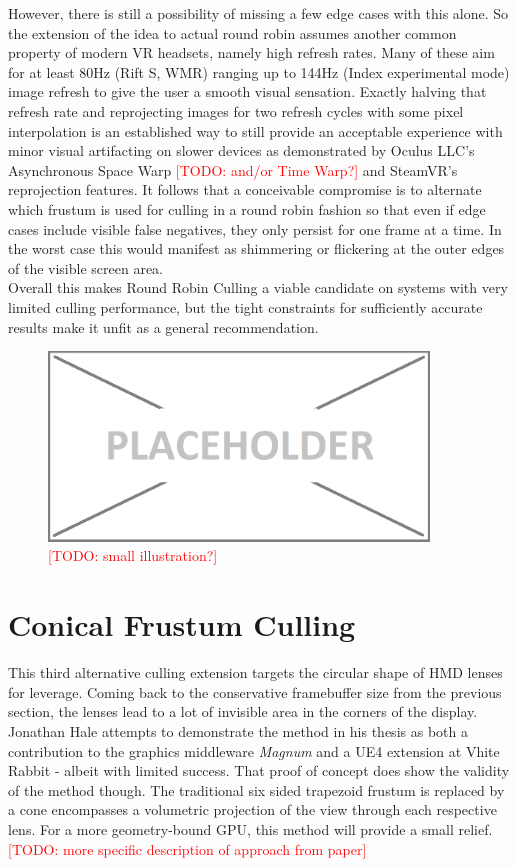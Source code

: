 However, there is still a possibility of missing a few edge cases with this alone. So the extension of the idea to actual round robin assumes another common property of modern VR headsets, namely high refresh rates. Many of these aim for at least 80Hz (Rift S, WMR) ranging up to 144Hz (Index experimental mode) image refresh to give the user a smooth visual sensation.
Exactly halving that refresh rate and reprojecting images for two refresh cycles with some pixel interpolation is an established way to still provide an acceptable experience with minor visual artifacting on slower devices as demonstrated by Oculus LLC's Asynchronous Space Warp \textcolor{red}{[TODO: and/or Time Warp?]} and SteamVR's reprojection features. It follows that a conceivable compromise is to alternate which frustum is used for culling in a round robin fashion so that even if edge cases include visible false negatives, they only persist for one frame at a time. In the worst case this would manifest as shimmering or flickering at the outer edges of the visible screen area. \\
Overall this makes Round Robin Culling a viable candidate on systems with very limited culling performance, but the tight constraints for sufficiently accurate results make it unfit as a general recommendation. 

\begin{figure}[htb]
  \centering
  \includegraphics[width=0.9\textwidth]{pictures/placeholder}
  \caption{\textcolor{red}{[TODO: small illustration?]}} \label{fig:blob}
\end{figure}

\section{Conical Frustum Culling}
This third alternative culling extension targets the circular shape of HMD lenses for leverage. Coming back to the conservative framebuffer size from the previous section, the lenses lead to a lot of invisible area in the corners of the display. Jonathan Hale attempts to demonstrate the method in his thesis \cite{Hale.2018} as both a contribution to the graphics middleware \textit{Magnum}\cite{Vondrus.30.10.2019} and a UE4 extension at Vhite Rabbit\cite{VhiteRabbit.08.01.2020} - albeit with limited success. That proof of concept does show the validity of the method though. The traditional six sided trapezoid frustum is replaced by a cone encompasses a volumetric projection of the view through each respective lens. For a more geometry-bound GPU, this method will provide a small relief. \\
\textcolor{red}{[TODO: more specific description of approach from paper]}

